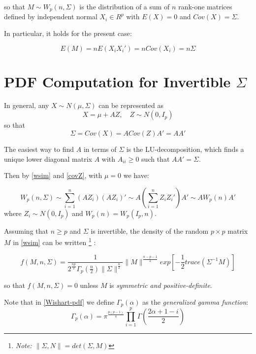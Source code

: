 \documentclass[12pt,openright,twoside,a4paper]{book}
\begin{document}
so that $M\sim W_p(n, \Sigma)$  is the distribution of a sum of $n$ rank-one matrices defined by independent normal $X_i \in R^p$ with $E(X)=0$ and $Cov(X)=\Sigma$.

In particular, it holds for the present case:

\begin{equation}
E(M)=nE(X_iX_i') = nCov(X_i) = n\Sigma
\end{equation}

\section{PDF Computation for Invertible $\Sigma$}

In general, any $X\sim N(\mu,\Sigma)$ can be represented as
\begin{equation}
X=\mu + AZ,\quad Z\sim N(0,I_p)
\end{equation}
so that
\begin{equation}
\Sigma= Cov(X) = A Cov(Z)A' = AA'
\label{covZ}
\end{equation}


The easiest way to find $ A$ in terms of $\Sigma$ is the LU-decomposition, which finds a unique lower diagonal matrix $A$ with $A_{ii} \geqslant 0 $ such that $AA' = \Sigma$.

Then by \ref{wsim} and \ref{covZ}, with $\mu=0$ we have:

\begin{equation}
W_p(n, \Sigma)\sim \sum_{i=1}^n(AZ_i)(AZ_i)'\sim A(\sum_{i=1}^nZ_iZ_i')A'\sim AW_p(n)A'
\end{equation}
where $Z_i\sim N(0, I_p)$ and $W_p(n)=W_p(I_p,n)$. 

Assuming that  $n\geq p$ and $\Sigma$ is invertible, the density of the random $p\times p $ matrix $M$ in \ref{wsim} can be written \footnote{\textit{Note: $\|\Sigma , N \| = det (\Sigma , M)$}} :

\begin{equation}
f(M, n, \Sigma)=\frac{1}{2^{\frac{np}{2}}\Gamma_p(\frac{n}{2})\|\Sigma\|^{\frac{n}{2}}}\|M\|^{\frac{n-p-1}{2}}exp[-\frac{1}{2}trace(\Sigma^{-1}M)]
\label{Wishart-pdf}
\end{equation} 

so that $f(M, n, \Sigma)=0$ unless $M$ is \textit{symmetric and positive-definite}. \cite{IMS}

Note that in \ref{Wishart-pdf} we define $\Gamma_p(\alpha)$ as the \textit{generalized gamma function}:
\begin{equation}
\Gamma_p(\alpha)=\pi^\frac{p(p-1)}{4}\prod_{i=1}^p\Gamma(\frac{2\alpha+1-i}{2})
\end{equation}
\end{document}
